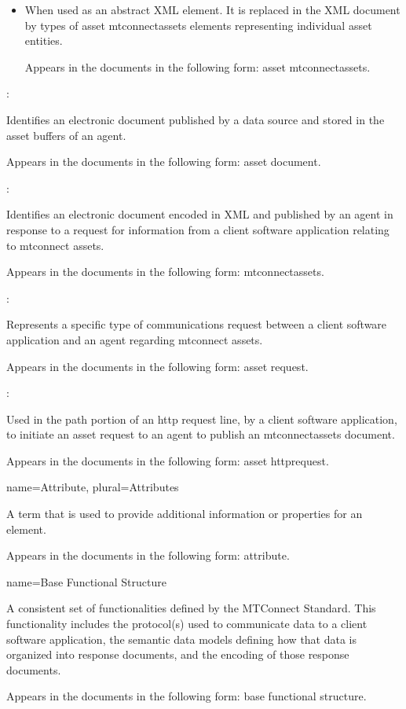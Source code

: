 {\begin{itemize}
      \item When used as an abstract XML element. It is replaced in the XML document by types of \gls{asset mtconnectassets} elements representing individual \gls{asset} entities.
      
      Appears in the documents in the following form: \gls{asset mtconnectassets}.
  \end{itemize}

  :

  Identifies an electronic document published by a data source and stored in the \glspl{asset buffer} of an \gls{agent}.
  
  Appears in the documents in the following form: \gls{asset document}.
  
  :

  Identifies an electronic document encoded in XML and published by an \gls{agent} in response to a \gls{request} for information from a client software application relating to \glspl{mtconnect asset}.

  Appears in the documents in the following form: \gls{mtconnectassets}.

  :

  Represents a specific type of communications request between a client software application and an \gls{agent} regarding \glspl{mtconnect asset}.

  Appears in the documents in the following form: \gls{asset request}.

  :

  Used in the path portion of an \gls{http request line}, by a client software application, to initiate an \gls{asset request} to an \gls{agent} to publish an \gls{mtconnectassets} document.

  Appears in the documents in the following form: \gls{asset httprequest}.
}


{
  name={Attribute},
  plural={Attributes}
}
{
  A term that is used to provide additional information or properties for an element.

  Appears in the documents in the following form: attribute.
}


{
  name={Base Functional Structure}
}
{
  A consistent set of functionalities defined by the MTConnect Standard. This functionality includes the protocol(s) used to communicate data to a client software application, the \glspl{semantic data model} defining how that data is organized into \glspl{response document}, and the encoding of those \glspl{response document}.

  Appears in the documents in the following form: \gls{base functional structure}.
}

